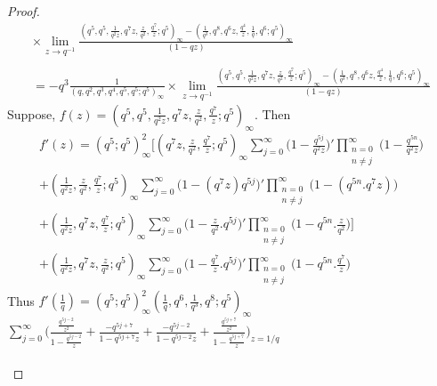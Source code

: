 \documentclass[10pt,reqno]{amsart}
\begin{document}
\begin{proof}
\begin{multline*}
     \times \lim_{z\to q^{-1}}\displaystyle\frac{(q^5,q^5,\displaystyle\frac{1}{q^2z},q^7z,\displaystyle\frac{z}{q^2},\displaystyle\frac{q^7}{z};q^5)_{\infty}-(\displaystyle\frac{1}{q^3},q^8,q^6z,\displaystyle\frac{q^4}{z},\displaystyle\frac{1}{q},q^6;q^5)_{\infty}}{(1-qz)} \\ \\
     =-q^3\displaystyle\frac{1}{(q,q^2,q^3,q^4,q^5,q^5;q^5)_{\infty}}
     \times \lim_{z\to q^{-1}}\displaystyle\frac{(q^5,q^5,\displaystyle\frac{1}{q^2z},q^7z,\displaystyle\frac{z}{q^2},\displaystyle\frac{q^7}{z};q^5)_{\infty}-(\displaystyle\frac{1}{q^3},q^8,q^6z,\displaystyle\frac{q^4}{z},\displaystyle\frac{1}{q},q^6;q^5)_{\infty}}{(1-qz)}
 \end{multline*}
 Suppose, $f(z)=(q^5,q^5,\displaystyle\frac{1}{q^2z},q^7z,\displaystyle\frac{z}{q^2},\displaystyle\frac{q^7}{z};q^5)_{\infty}.$ Then 
 \begin{multline*}
 f'(z)=(q^5;q^5)_{\infty}^2\Bigg[(q^7z,\displaystyle\frac{z}{q^2},\displaystyle\frac{q^7}{z};q^5)_{\infty}\displaystyle\sum_{j=0}^{\infty}\Bigg(1-\displaystyle\frac{q^{5j}}{q^2z}\Bigg)'\displaystyle\prod_{\substack{n=0\\n\neq j}}^{\infty}\Bigg(1-\displaystyle\frac{q^{5n}}{q^2z}\Bigg) \\ 
 +(\displaystyle\frac{1}{q^2z},\displaystyle\frac{z}{q^2},\displaystyle\frac{q^7}{z};q^5)_{\infty}\displaystyle\sum_{j=0}^{\infty}\Bigg(1-(q^7z)q^{5j}\Bigg)'\displaystyle\prod_{\substack{n=0\\n\neq j}}^{\infty}\Bigg(1-(q^{5n}.q^7z)\Bigg) \\ 
 +(\displaystyle\frac{1}{q^2z},q^7z,\displaystyle\frac{q^7}{z};q^5)_{\infty}\displaystyle\sum_{j=0}^{\infty}\Bigg(1-\displaystyle\frac{z}{q^2}.q^{5j}\Bigg)'\displaystyle\prod_{\substack{n=0\\n\neq j}}^{\infty}\Bigg(1-q^{5n}.\displaystyle\frac{z}{q^2}\Bigg)\Bigg] \\ 
 +(\displaystyle\frac{1}{q^2z},q^7z,\displaystyle\frac{z}{q^2};q^5)_{\infty}\displaystyle\sum_{j=0}^{\infty}\Bigg(1-\displaystyle\frac{q^7}{z}.q^{5j}\Bigg)'\displaystyle\prod_{\substack{n=0\\n\neq j}}^{\infty}\Bigg(1-q^{5n}.\displaystyle\frac{q^7}{z}\Bigg)
 \end{multline*}
 Thus $f'(\displaystyle\frac{1}{q})=(q^5;q^5)_{\infty}^2(\displaystyle\frac{1}{q},q^6,\displaystyle\frac{1}{q^3},q^8;q^5)_{\infty}$ $\displaystyle\sum_{j=0}^{\infty}\Bigg(\displaystyle\frac{\displaystyle\frac{q^{5j-2}}{z^2}}{1-\displaystyle\frac{q^{5j-2}}{z}}+\displaystyle\frac{-q^{5j+7}}{1-q^{5j+7}z}+\displaystyle\frac{-q^{5j-2}}{1-q^{5j-2}z}+\displaystyle\frac{\displaystyle\frac{q^{5j+7}}{z^2}}{1-\displaystyle\frac{q^{5j+7}}{z}}\Bigg)_{z=1/q}$ \\ \\

\end{proof}
\end{document}
